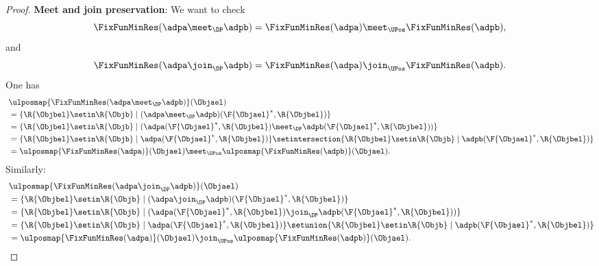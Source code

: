 \begin{proof}
    \textbf{Meet and join preservation}:
    We want to check
    \begin{equation*}
        \FixFunMinRes(\adpa \meet_\DP \adpb)=\FixFunMinRes(\adpa) \meet_\UPos \FixFunMinRes(\adpb),
    \end{equation*}
    and
    \begin{equation*}
        \FixFunMinRes(\adpa \join_\DP \adpb)=\FixFunMinRes(\adpa) \join_\UPos \FixFunMinRes(\adpb).
    \end{equation*}
    One has
    \begin{equation*}
        \begin{aligned}
            ~ &
            \ulposmap{\FixFunMinRes(\adpa \meet_\DP \adpb)}(\Objael) \\
              & =\{ \R{\Objbel} \setin \R{\Objb} \mid (\adpa \meet_\DP \adpb)(\F{\Objael}^*,\R{\Objbel})\} \\
              & =\{ \R{\Objbel} \setin \R{\Objb} \mid (\adpa(\F{\Objael}^*,\R{\Objbel})\meet_\DP \adpb(\F{\Objael}^*,\R{\Objbel}))\} \\
              & =\{ \R{\Objbel} \setin \R{\Objb} \mid \adpa(\F{\Objael}^*,\R{\Objbel})\} \setintersection \{ \R{\Objbel} \setin \R{\Objb} \mid  \adpb(\F{\Objael}^*,\R{\Objbel})\} \\
              & =\ulposmap{\FixFunMinRes(\adpa)}(\Objael) \meet_\UPos \ulposmap{\FixFunMinRes(\adpb)}(\Objael).
        \end{aligned}
    \end{equation*}
    Similarly:
    \begin{equation*}
        \begin{aligned}
            ~ & \ulposmap{\FixFunMinRes(\adpa \join_\DP \adpb)}(\Objael) \\
              & =\{ \R{\Objbel} \setin \R{\Objb} \mid (\adpa \join_\DP \adpb)(\F{\Objael}^*,\R{\Objbel})\} \\
              & =\{ \R{\Objbel} \setin \R{\Objb} \mid (\adpa(\F{\Objael}^*,\R{\Objbel})\join_\DP \adpb(\F{\Objael}^*,\R{\Objbel}))\} \\
              & =\{ \R{\Objbel} \setin \R{\Objb} \mid \adpa(\F{\Objael}^*,\R{\Objbel})\} \setunion \{ \R{\Objbel} \setin \R{\Objb} \mid  \adpb(\F{\Objael}^*,\R{\Objbel})\} \\
              & =\ulposmap{\FixFunMinRes(\adpa)}(\Objael) \join_\UPos \ulposmap{\FixFunMinRes(\adpb)}(\Objael).
        \end{aligned}
    \end{equation*}


\end{proof}
